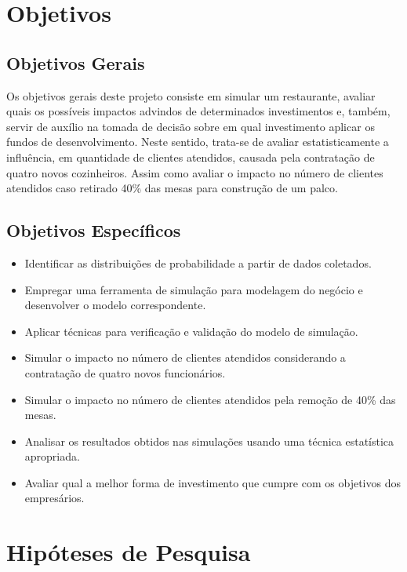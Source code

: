 \documentclass[pt,disc,oneside]{ufscpgeasthesis}
\begin{document}
		\section{Objetivos}
		\label{sec:objetivos}

			\subsection{Objetivos Gerais}
			\label{subsec:objetivos_gerais}

				Os objetivos gerais deste projeto consiste em simular um restaurante, avaliar quais os possíveis impactos advindos de determinados investimentos e, também, servir de auxílio na tomada de decisão sobre em qual investimento aplicar os fundos de desenvolvimento.
				Neste sentido, trata-se de avaliar estatisticamente a influência, em quantidade de clientes atendidos, causada pela contratação de quatro novos cozinheiros.
				Assim como avaliar o impacto no número de clientes atendidos caso retirado 40\% das mesas para construção de um palco.

			\subsection{Objetivos Específicos}
			\label{subsec:objetivos_especificos}

				\begin{itemize}
					\item Identificar as distribuições de probabilidade a partir de dados coletados.
					\item Empregar uma ferramenta de simulação para modelagem do negócio e desenvolver o modelo correspondente.
					\item Aplicar técnicas para verificação e validação do modelo de simulação.
					\item Simular o impacto no número de clientes atendidos considerando a contratação de quatro novos funcionários.
					\item Simular o impacto no número de clientes atendidos pela remoção de 40\% das mesas.
					\item Analisar os resultados obtidos nas simulações usando uma técnica estatística apropriada.
					\item Avaliar qual a melhor forma de investimento que cumpre com os objetivos dos empresários.
				\end{itemize}

		\section{Hipóteses de Pesquisa}
		\label{sec:hipoteses}
\end{document}
